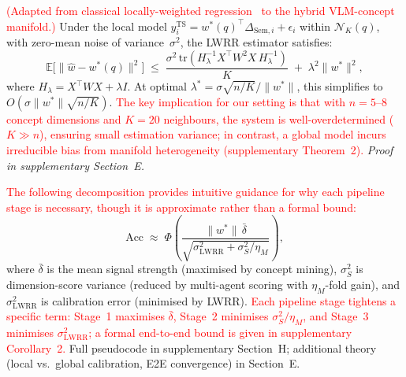 \documentclass[runningheads]{llncs}
\begin{document}
\begin{theorem}\label{thm:calibration}
\textcolor{red}{(Adapted from classical locally-weighted regression~\cite{cleveland1979robust,caponnetto2007optimal} to the hybrid VLM-concept manifold.)}
Under the local model $y_i^{\mathrm{TS}} = w^{*\!}(q)^{\!\top} \Delta_{\mathrm{Sem},i} + \epsilon_i$ within $\mathcal{N}_K(q)$, with zero-mean noise of variance~$\sigma^2$, the LWRR estimator satisfies:
\begin{equation}
\mathbb{E}\bigl[\|\hat{w} - w^{*\!}(q)\|^2\bigr]
\;\leq\;
\frac{\sigma^2\,\mathrm{tr}(H_\lambda^{-1}X^{\!\top}W^2\!X\,H_\lambda^{-1})}{K}
\;+\;
\lambda^2\|w^{*}\|^2,
\label{eq:lwrr_bound}
\end{equation}
where $H_\lambda = X^{\!\top}\!W\!X + \lambda I$.
At optimal $\lambda^{*} \!=\! \sigma\sqrt{n/K}/\|w^{*}\|$, this simplifies to $O(\sigma\|w^{*}\|\sqrt{n/K})$.
\textcolor{red}{The key implication for our setting is that with $n{=}5$--$8$ concept dimensions and $K{=}20$ neighbours, the system is well-overdetermined ($K \gg n$), ensuring small estimation variance; in contrast, a global model incurs irreducible bias from manifold heterogeneity (supplementary Theorem~2).}
\emph{Proof in supplementary Section~E.}
\end{theorem}

\noindent \textcolor{red}{The following decomposition provides intuitive guidance for why each pipeline stage is necessary, though it is approximate rather than a formal bound:}
\begin{equation}
\mathrm{Acc} \;\approx\; \Phi\!\left(\frac{\|w^{*}\|\,\bar{\delta}}{\sqrt{\sigma_{\mathrm{LWRR}}^{2} + \sigma_{S}^{2}/\eta_{M}}}\right),
\label{eq:accuracy}
\end{equation}
where $\bar{\delta}$ is the mean signal strength (maximised by concept mining), $\sigma_S^2$ is dimension-score variance (reduced by multi-agent scoring with $\eta_M$-fold gain), and $\sigma_{\mathrm{LWRR}}^2$ is calibration error (minimised by LWRR).
\textcolor{red}{Each pipeline stage tightens a specific term: Stage~1 maximises $\bar{\delta}$, Stage~2 minimises $\sigma_S^2/\eta_M$, and Stage~3 minimises $\sigma_{\mathrm{LWRR}}^2$; a formal end-to-end bound is given in supplementary Corollary~2.}
Full pseudocode in supplementary Section~H; additional theory (local vs.\ global calibration, E2E convergence) in Section~E.


\end{document}
